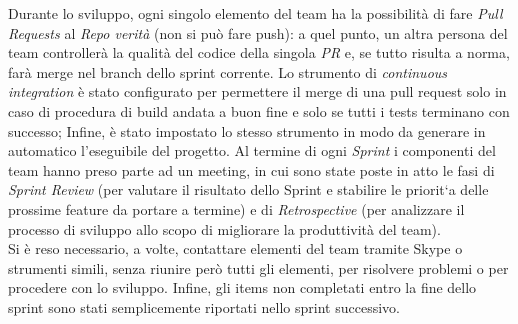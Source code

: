 \newline
Durante lo sviluppo, ogni singolo elemento del team ha la possibilità di fare \textit{Pull Requests} al 
\textit{Repo verità} (non si può fare push): a quel punto,
un altra persona del team controllerà la qualità del codice della singola \textit{PR} e, 
se tutto risulta a norma, farà merge nel branch dello sprint corrente.
Lo strumento di \textit{continuous integration} è stato configurato per permettere il merge di una pull request solo in caso di procedura di build 
andata a buon fine e solo se tutti i tests terminano con successo; Infine, è stato impostato lo stesso strumento in modo da
generare in automatico l'eseguibile del progetto.
\newline
Al termine di ogni \textit{Sprint} i componenti del team hanno preso parte ad un meeting, in cui sono state
poste in atto le fasi di \textit{Sprint Review} (per valutare il risultato dello Sprint e stabilire le priorit`a delle
prossime feature da portare a termine) e di \textit{Retrospective} (per analizzare il processo di sviluppo
allo scopo di migliorare la produttività del team).
\\
Si è reso necessario, a volte, contattare elementi del team tramite Skype o strumenti simili, 
senza riunire però tutti gli elementi, per risolvere problemi o per procedere con lo sviluppo.
Infine, gli items non completati entro la fine dello sprint sono stati semplicemente riportati
nello sprint successivo.

